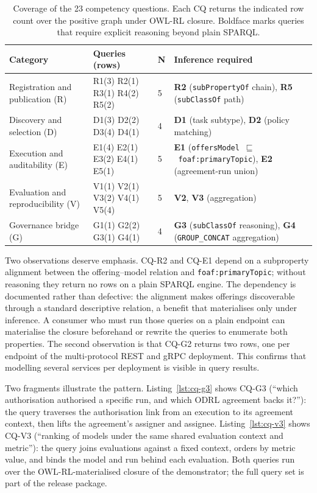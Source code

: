 \documentclass[11pt,a4paper]{article}
\newcommand{\code}[1]{\texttt{#1}}
\begin{document}
\begin{table}[t]
\small\sf\centering
\caption{Coverage of the 23 competency questions. Each CQ returns the indicated row count over the positive graph under OWL-RL closure. Boldface marks queries that require explicit reasoning beyond plain SPARQL.\label{tab:cqs}}
\begin{tabular}{@{}p{3.3cm}p{2.6cm}p{0.8cm}p{6.3cm}@{}}
\toprule
\textbf{Category} & \textbf{Queries (rows)} & \textbf{N} & \textbf{Inference required} \\
\midrule
Registration and publication (R) & R1(3) R2(1) R3(1) R4(2) R5(2) & 5 & \textbf{R2} (\code{subPropertyOf} chain), \textbf{R5} (\code{subClassOf} path) \\
Discovery and selection (D) & D1(3) D2(2) D3(4) D4(1) & 4 & \textbf{D1} (task subtype), \textbf{D2} (policy matching) \\
Execution and auditability (E) & E1(4) E2(1) E3(2) E4(1) E5(1) & 5 & \textbf{E1} (\code{offersModel}~$\sqsubseteq$~\code{foaf:primaryTopic}), \textbf{E2} (agreement-run union) \\
Evaluation and reproducibility (V) & V1(1) V2(1) V3(2) V4(1) V5(4) & 5 & \textbf{V2}, \textbf{V3} (aggregation) \\
Governance bridge (G) & G1(1) G2(2) G3(1) G4(1) & 4 & \textbf{G3} (\code{subClassOf} reasoning), \textbf{G4} (\code{GROUP\_CONCAT} aggregation) \\
\bottomrule
\end{tabular}
\end{table}

Two observations deserve emphasis. CQ-R2 and CQ-E1 depend on a subproperty alignment between the offering--model relation and \code{foaf:primaryTopic}; without reasoning they return no rows on a plain SPARQL engine. The dependency is documented rather than defective: the alignment makes offerings discoverable through a standard descriptive relation, a benefit that materialises only under inference. A consumer who must run those queries on a plain endpoint can materialise the closure beforehand or rewrite the queries to enumerate both properties. The second observation is that CQ-G2 returns two rows, one per endpoint of the multi-protocol REST and gRPC deployment. This confirms that modelling several services per deployment is visible in query results.

Two fragments illustrate the pattern. Listing~\ref{lst:cq-g3} shows CQ-G3 (``which authorisation authorised a specific run, and which ODRL agreement backs it?''): the query traverses the authorisation link from an execution to its agreement context, then lifts the agreement's assigner and assignee. Listing~\ref{lst:cq-v3} shows CQ-V3 (``ranking of models under the same shared evaluation context and metric''): the query joins evaluations against a fixed context, orders by metric value, and binds the model and run behind each evaluation. Both queries run over the OWL-RL-materialised closure of the demonstrator; the full query set is part of the release package.
\end{document}
